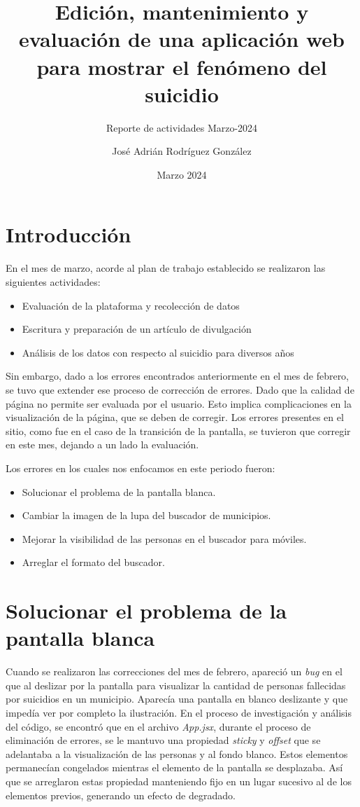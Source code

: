 \documentclass[11pt,DIV=9, letterpaper, oneside, openright]{scrartcl}
\title{Edición, mantenimiento y evaluación de una aplicación web para mostrar el fenómeno del suicidio}
\subtitle{Reporte de actividades Marzo-2024}
\author{José Adrián Rodríguez González }
\date{Marzo 2024}
\begin{document}
\maketitle

\section{Introducción}
En el mes de marzo, acorde al plan de trabajo establecido se realizaron las siguientes actividades:

\begin{itemize}
    \item Evaluación de la plataforma y recolección de datos 
    \item Escritura y preparación de un artículo de divulgación
    \item Análisis de los datos con respecto al suicidio para diversos años 
\end{itemize}

Sin embargo, dado a los errores encontrados anteriormente en el mes de febrero, se tuvo que extender ese proceso de corrección de errores. Dado que la calidad de página no permite ser evaluada por el usuario. Esto implica complicaciones en la visualización de la página, que se deben de corregir. Los errores presentes en el sitio, como fue en el caso de la transición de la pantalla, se tuvieron que corregir en este mes, dejando a un lado la evaluación. 

Los errores en los cuales nos enfocamos en este periodo fueron:

\begin{itemize}
    \item Solucionar el problema de la pantalla blanca.
    \item Cambiar la imagen de la lupa del buscador de municipios.
    \item Mejorar la visibilidad de las personas en el buscador para móviles.
    \item Arreglar el formato del buscador.
\end{itemize}

\section{Solucionar el problema de la pantalla blanca}

Cuando se realizaron las correcciones del mes de febrero, apareció un \emph{bug} en el que al deslizar por la pantalla para visualizar la cantidad de personas fallecidas por suicidios en un municipio. Aparecía una pantalla en blanco deslizante y que impedía ver por completo la ilustración. En el proceso de investigación y análisis del código, se encontró que en el archivo \emph{App.jsx}, durante el proceso de eliminación de errores, se le mantuvo una propiedad \emph{sticky} y \emph{offset} que se adelantaba a la visualización de las personas y al fondo blanco. Estos elementos permanecían congelados mientras el elemento de la pantalla se desplazaba. Así que se arreglaron estas propiedad manteniendo fijo en un lugar sucesivo al de los elementos previos, generando un efecto de degradado.
\end{document}
